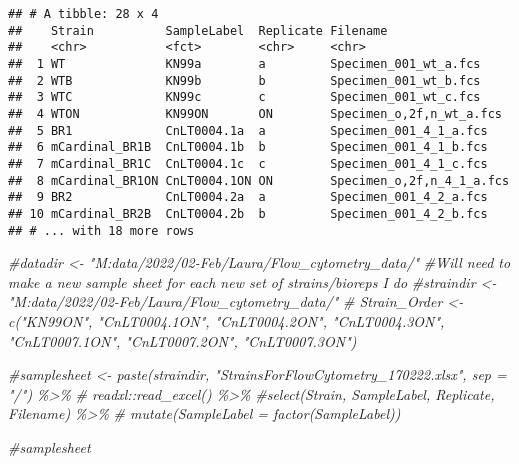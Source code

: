\documentclass[
]{article}
\newenvironment{Shaded}{\begin{snugshade}}{\end{snugshade}}
\newcommand{\CommentTok}[1]{\textcolor[rgb]{0.56,0.35,0.01}{\textit{#1}}}
\begin{document}
\begin{verbatim}
## # A tibble: 28 x 4
##    Strain          SampleLabel  Replicate Filename                 
##    <chr>           <fct>        <chr>     <chr>                    
##  1 WT              KN99a        a         Specimen_001_wt_a.fcs    
##  2 WTB             KN99b        b         Specimen_001_wt_b.fcs    
##  3 WTC             KN99c        c         Specimen_001_wt_c.fcs    
##  4 WTON            KN99ON       ON        Specimen_o,2f,n_wt_a.fcs 
##  5 BR1             CnLT0004.1a  a         Specimen_001_4_1_a.fcs   
##  6 mCardinal_BR1B  CnLT0004.1b  b         Specimen_001_4_1_b.fcs   
##  7 mCardinal_BR1C  CnLT0004.1c  c         Specimen_001_4_1_c.fcs   
##  8 mCardinal_BR1ON CnLT0004.1ON ON        Specimen_o,2f,n_4_1_a.fcs
##  9 BR2             CnLT0004.2a  a         Specimen_001_4_2_a.fcs   
## 10 mCardinal_BR2B  CnLT0004.2b  b         Specimen_001_4_2_b.fcs   
## # ... with 18 more rows
\end{verbatim}

\begin{Shaded}
\begin{Highlighting}[]
\CommentTok{\#datadir \textless{}{-} "M:data/2022/02{-}Feb/Laura/Flow\_cytometry\_data/"}
\CommentTok{\#Will need to make a new sample sheet for each new set of strains/bioreps I do}
\CommentTok{\#straindir \textless{}{-} "M:data/2022/02{-}Feb/Laura/Flow\_cytometry\_data/"}
\CommentTok{\# Strain\_Order \textless{}{-}  c("KN99ON", "CnLT0004.1ON", "CnLT0004.2ON", "CnLT0004.3ON", "CnLT0007.1ON", "CnLT0007.2ON", "CnLT0007.3ON")}

\CommentTok{\#samplesheet \textless{}{-} paste(straindir, "StrainsForFlowCytometry\_170222.xlsx", sep = "/") \%\textgreater{}\%}
 \CommentTok{\# readxl::read\_excel() \%\textgreater{}\%}
  \CommentTok{\#select(Strain, SampleLabel, Replicate, Filename) \%\textgreater{}\%}
\CommentTok{\#  mutate(SampleLabel = factor(SampleLabel))}

\CommentTok{\#samplesheet}
\end{Highlighting}
\end{Shaded}
\end{document}
